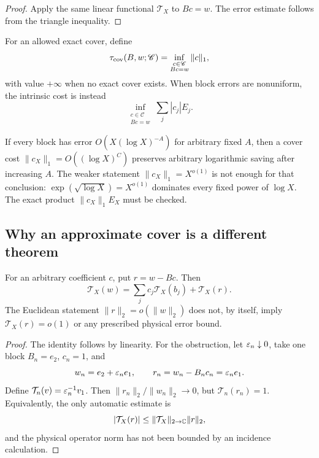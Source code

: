 \begin{proof}
Apply the same linear functional \(\mathcal T_X\) to \(Bc=w\).
The error estimate follows from the triangle inequality.
\end{proof}

\begin{definition}
\label{def:cover-amplification}
For an allowed exact cover, define
\[
 \tau_{\mathrm{cov}}(B,w;\mathscr C)
 =
 \inf_{\substack{c\in\mathscr C\\Bc=w}}\|c\|_1,
\]
with value \(+\infty\) when no exact cover exists.  When block errors
are nonuniform, the intrinsic cost is instead
\[
 \inf_{\substack{c\in\mathscr C\\Bc=w}}
 \sum_j|c_j|E_j.
\]
\end{definition}

\begin{remark}
If every block has error \(O(X(\log X)^{-A})\) for arbitrary fixed
\(A\), then a cover cost
\(\|c_X\|_1=O((\log X)^C)\) preserves arbitrary logarithmic saving
after increasing \(A\).  The weaker statement
\(\|c_X\|_1=X^{o(1)}\) is not enough for that conclusion:
\(\exp(\sqrt{\log X})=X^{o(1)}\) dominates every fixed power of
\(\log X\).  The exact product
\(\|c_X\|_1E_X\) must be checked.
\end{remark}

\subsection{Why an approximate cover is a different theorem}

\begin{proposition}
\label{prop:residual-remainder}
For an arbitrary coefficient \(c\), put \(r=w-Bc\).  Then
\begin{equation}
 \mathcal T_X(w)
 =
 \sum_jc_j\mathcal T_X(b_j)
 +
 \mathcal T_X(r).
 \label{eq:residual-remainder}
\end{equation}
The Euclidean statement
\(\|r\|_2=o(\|w\|_2)\) does not, by itself, imply
\(\mathcal T_X(r)=o(1)\) or any prescribed physical error bound.
\end{proposition}

\begin{proof}
The identity follows by linearity.  For the obstruction, let
\(\varepsilon_n\downarrow0\), take one block \(B_n=e_2\), \(c_n=1\),
and
\[
 w_n=e_2+\varepsilon_ne_1,\qquad r_n=w_n-B_nc_n=\varepsilon_ne_1.
\]
Define \(\mathcal T_n(v)=\varepsilon_n^{-1}v_1\).  Then
\(\|r_n\|_2/\|w_n\|_2\to0\), but
\(\mathcal T_n(r_n)=1\).  Equivalently, the only automatic estimate is
\[
 |\mathcal T_X(r)|
 \le
 \|\mathcal T_X\|_{2\to\mathbb C}\|r\|_2,
\]
and the physical operator norm has not been bounded by an incidence
calculation.
\end{proof}

